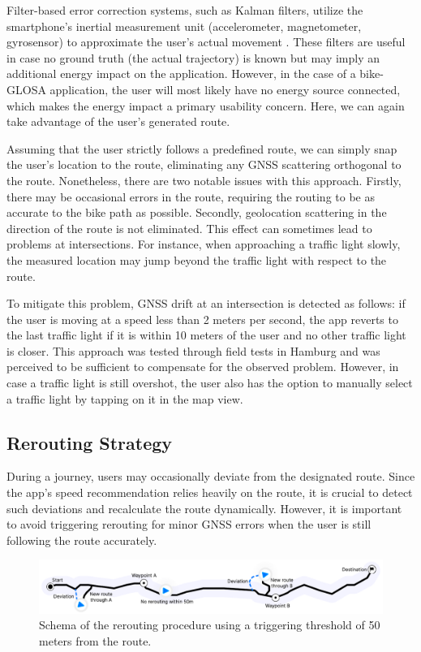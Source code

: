 Filter-based error correction systems, such as Kalman filters, utilize the smartphone's inertial measurement unit (accelerometer, magnetometer, gyrosensor) to approximate the user's actual movement \cite{US20200049837A1}. These filters are useful in case no ground truth (the actual trajectory) is known but may imply an additional energy impact on the application. However, in the case of a bike-GLOSA application, the user will most likely have no energy source connected, which makes the energy impact a primary usability concern. Here, we can again take advantage of the user's generated route.

Assuming that the user strictly follows a predefined route, we can simply snap the user's location to the route, eliminating any GNSS scattering orthogonal to the route. Nonetheless, there are two notable issues with this approach. Firstly, there may be occasional errors in the route, requiring the routing to be as accurate to the bike path as possible. Secondly, geolocation scattering in the direction of the route is not eliminated. This effect can sometimes lead to problems at intersections. For instance, when approaching a traffic light slowly, the measured location may jump beyond the traffic light with respect to the route. 

To mitigate this problem, GNSS drift at an intersection is detected as follows: if the user is moving at a speed less than 2 meters per second, the app reverts to the last traffic light if it is within 10 meters of the user and no other traffic light is closer. This approach was tested through field tests in Hamburg and was perceived to be sufficient to compensate for the observed problem. However, in case a traffic light is still overshot, the user also has the option to manually select a traffic light by tapping on it in the map view.

\subsection{Rerouting Strategy}

During a journey, users may occasionally deviate from the designated route. Since the app's speed recommendation relies heavily on the route, it is crucial to detect such deviations and recalculate the route dynamically. However, it is important to avoid triggering rerouting for minor GNSS errors when the user is still following the route accurately.

\begin{figure}[htbp]
\centering
\includegraphics[width=\linewidth]{images/rerouting-strategy.pdf}
\caption{Schema of the rerouting procedure using a triggering threshold of 50 meters from the route.}
\label{fig:rerouting-strategy}
\end{figure}

